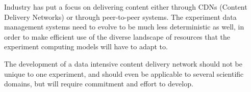 Industry has put a focus on delivering
content either through CDNs (Content Delivery Networks) 
or through peer-to-peer systems. 
The experiment data management systems need to evolve to be much less
deterministic as well, in order to make efficient use of the diverse
landscape of resources that the experiment computing models will have to adapt to. 

The development of a data intensive content delivery network
should not be unique to one experiment, and should even be applicable
to several scientific domains, but will require commitment and effort
to develop.


